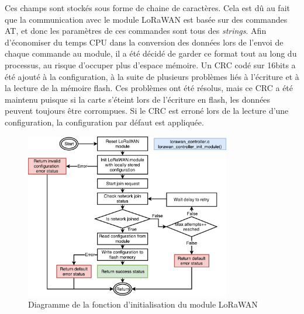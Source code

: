 \begin{tcolorbox}
  [top=-1mm, bottom=-3mm, left=0mm, right=0mm, enhanced,breakable,
  attach boxed title to top center={yshift=-3mm,yshifttext=-1mm},colback=LightGray,colframe=DarkGray,
  colbacktitle=DarkGray, fonttitle=\footnotesize\bfseries,boxed title style={size=small,colframe=DarkGray},
  title=\path{lorawan_controller.h} ]


\inputminted[firstline=30,lastline=54,bgcolor=LightGray,fontsize=\tiny,breaklines,linenos]{C}{SourceCode/lorawan_controller.h}
\end{tcolorbox}

Ces champs sont stockés sous forme de chaine de caractères. Cela est dû au fait que la communication avec le module LoRaWAN est basée sur des commandes AT, et donc les paramètres de ces commandes sont tous des \textit{strings}. Afin d'économiser du temps CPU dans la conversion des données lors de l'envoi de chaque commande au module, il a été décidé de garder ce format tout au long du processus, au risque d'occuper plus d'espace mémoire. Un CRC codé sur 16bits a été ajouté à la configuration, à la suite de plusieurs problèmes liés à l'écriture et à la lecture de la mémoire flash. Ces problèmes ont été résolus, mais ce CRC a été maintenu puisque si la carte s'éteint lors de l'écriture en flash, les données peuvent toujours être corrompues. Si le CRC est erroné lors de la lecture d'une configuration, la configuration par défaut est appliquée. 

\begin{figure}[ht!]
    \centering
    \includegraphics[width=0.8\textwidth]{Figures/Software/diagram_lorawan_init_module.pdf}
    \caption{Diagramme de la fonction d'initialisation du module LoRaWAN}
    \label{fig-diagram_lorawan_init_module}
\end{figure}

